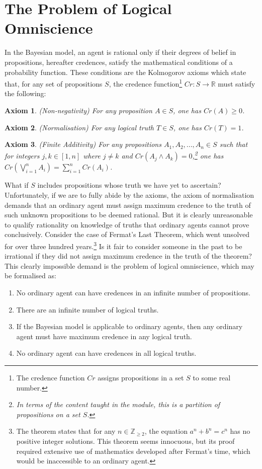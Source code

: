 \documentclass[12pt]{article}
\newtheorem{axiom}{Axiom}
\begin{document}
\section{The Problem of Logical Omniscience}
In the Bayesian model, an agent is rational only if their degrees of belief in propositions, hereafter credences, satisfy the mathematical conditions of a probability function.\autocite[13]{bdrc} These conditions are the Kolmogorov axioms which state that, for any set of propositions $S$, the credence function\footnote{The credence function $Cr$ assigns propositions in a set $S$ to some real number.} $Cr:S\rightarrow\mathbb{R}$ must satisfy the following:
\begin{axiom}
    (Non-negativity) For any proposition $A\in S$, one has $Cr(A)\geq0$.
\end{axiom}
\begin{axiom}
    (Normalisation) For any logical truth $T\in S$, one has $Cr(T)=1$.
\end{axiom}
\begin{axiom}
    (Finite Additivity) For any propositions $A_1, A_2, ..., A_n\in S$ such that for integers $j,k\in[1,n]$ where $j\neq k$ and $Cr(A_j\land A_k)=0$,\footnote{In terms of the content taught in the module, this is a partition of propositions on a set $S$.} one has $Cr(\bigvee_{i=1}^{n}A_i)=\sum_{i=1}^{n}Cr(A_i)$.
\end{axiom}
What if $S$ includes propositions whose truth we have yet to ascertain? Unfortunately, if we are to fully abide by the axioms, the axiom of normalisation demands that an ordinary agent must assign maximum credence to the truth of such unknown propositions to be deemed rational. But it is clearly unreasonable to qualify rationality on knowledge of truths that ordinary agents cannot prove conclusively. Consider the case of Fermat's Last Theorem, which went unsolved for over three hundred years.\footnote{The theorem states that for any $n\in\mathbb{Z}_{\geq2}$, the equation $a^n+b^n=c^n$ has no positive integer solutions. This theorem seems innocuous, but its proof required extensive use of mathematics developed after Fermat's time, which would be inaccessible to an ordinary agent.} Is it fair to consider someone in the past to be irrational if they did not assign maximum credence in the truth of the theorem?\autocite[108]{dogramaci} This clearly impossible demand is the problem of logical omniscience, which may be formalised as:\autocite{youtube}
\begin{enumerate}[label=\textbf{P\arabic*:},leftmargin=0.5in]
    \item No ordinary agent can have credences in an infinite number of propositions.
    \item There are an infinite number of logical truths.
    \item If the Bayesian model is applicable to ordinary agents, then any ordinary agent must have maximum credence in any logical truth.
    \item No ordinary agent can have credences in all logical truths.
\end{enumerate}
\end{document}
